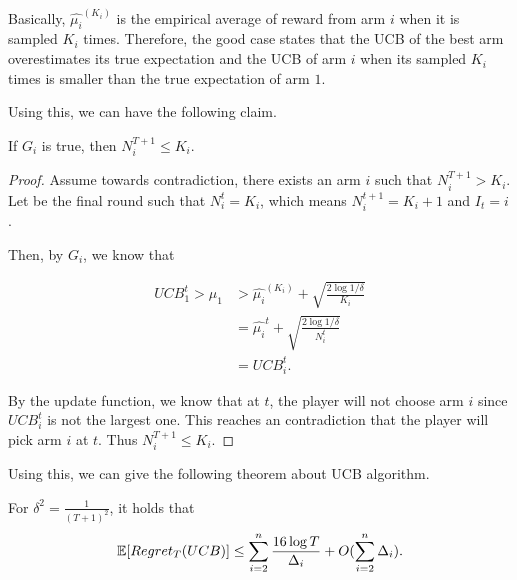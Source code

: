 \documentclass[../main.tex]{subfiles}
\begin{document}
	Basically, $\hat{\mu_i}^{(K_i)}$ is the empirical average of reward from arm $i$ when it is sampled $K_i$ times. Therefore, the good case states that the UCB of the best arm overestimates its true expectation and the UCB of arm $i$ when its sampled $K_i$ times is smaller than the true expectation of arm $1$.
	
	
	Using this, we can have the following claim.
	
	\begin{claim}
		If $G_i$ is true, then $N_i^{T+1} \leq K_i$.
	\end{claim}

	\begin{proof}
		Assume towards contradiction, there exists an arm $i$ such that $N_i^{T+1} > K_i$. Let be the final round such that $N_i^t = K_i$, which means $N_i^{t+1} = K_i +1$ and $I_t = i$.
		
		Then, by $G_i$, we know that
		
		\begin{equation*}
			\begin{aligned}
				UCB_1^t > \mu_1 & > \hat{\mu_i}^{(K_i)} + \sqrt{\frac{2\log 1/ \delta}{K_i}} \\
								& =  \hat{\mu_i}^{t} +  \sqrt{\frac{2\log 1/ \delta}{N_i^t}} \\
								& = UCB_i^t.
			\end{aligned}
		\end{equation*}
		
		By the update function, we know that at $t$, the player will not choose arm $i$ since $UCB_i^t$ is not the largest one. This reaches an contradiction that the player will pick arm $i$ at $t$. Thus $N_i^{T+1} \leq K_i$.
	\end{proof}

	Using this, we can give the following theorem about UCB algorithm.
	
	\begin{theorem}
		For $\delta^2 = \frac{1}{(T+1)^2}$, it holds that 
			\begin{equation}
				\mathbb{E}[Regret_T(UCB)] \leq \sum\limits_{i=2}^n \frac{16 \log T}{\Delta_i} + O(\sum\limits_{i=2}^n \Delta_i).
			\end{equation}
	\end{theorem}
\end{document}
